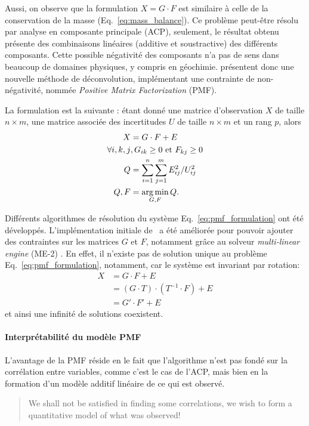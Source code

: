 Aussi, on observe que la formulation $X = G\cdot F$ est similaire à celle de
la conservation de la masse (Eq.~\ref{eq:mass_balance}). Ce problème peut-être résolu par
analyse en composante principale (ACP), seulement, le résultat obtenu présente des
combinaisons linéaires (additive et soustractive) des différents composants. Cette possible
négativité des composants n'a pas de sens dans beaucoup de domaines physiques, y compris en
géochimie. \cite{paateroPositive1994} présentent donc une nouvelle méthode de
déconvolution, implémentant une contrainte de non-négativité, nommée \textit{Positive Matrix
Factorization} (PMF). 

La formulation est la suivante : étant donné une matrice d'observation $X$ de taille
$n\times m$, une matrice associée des incertitudes $U$ de taille $n \times m$ et un rang
$p$, alors 
\begin{align}
    \label{eq:pmf_formulation}
    X &= G \cdot F + E \\
    \forall i,k,j &, G_{ik}\geq 0 \text{ et } F_{kj}\geq 0\\
    Q &= \sum_{i=1}^n\sum_{j=1}^m E_{ij}^2/U_{ij}^2\label{eq:Qfunction}\\
    {Q, F} &= \operatorname*{arg\,min}_{G,F} Q.
\end{align}

Différents algorithmes de résolution du système Eq.~\ref{eq:pmf_formulation} ont été développés.
L'implémentation initiale de~\cite{paateroLeast1997} a été améliorée pour pouvoir
ajouter des contraintes sur les matrices $G$ et $F$, notamment grâce au solveur
\textit{multi-linear engine} (ME-2) \autocite{paateroMultilinear1999}. En effet, il
n'existe pas de solution unique au problème Eq.~\ref{eq:pmf_formulation}, notamment, car le
système est invariant par rotation:
\begin{align}
    \label{eq:rotationalambiguity}
    X   &= G \cdot F + E \\
        &= (G \cdot T) \cdot (T^{-1} \cdot F) + E\\
        &= G' \cdot F' + E
\end{align}
et ainsi une infinité de solutions coexistent. 

\paragraph{Interprétabilité du modèle PMF}%
\label{par:interpretabilite_du_model_PMF}

L'avantage de la PMF réside en le fait que l'algorithme n'est pas fondé sur la
corrélation entre variables, comme c'est le cas de l'ACP, mais bien en la formation d'un
modèle additif linéaire de ce qui est observé.
\begin{quote}
    We shall not be satisfied in finding some correlations, we wish to form a quantitative
    model of what was observed! \autocite{paateroPositive1994}
\end{quote}

